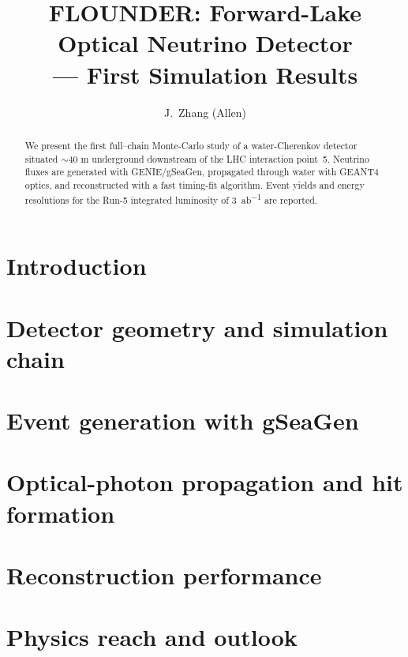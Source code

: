 \documentclass[11pt,aps,prd,nofootinbib,notitlepage]{revtex4-2}
\begin{document}
\title{FLOUNDER: Forward-Lake Optical Neutrino Detector\\
       --- First Simulation Results}

\author{J.~Zhang (Allen)}

\begin{abstract}
We present the first full–chain Monte-Carlo study of a
water-Cherenkov detector situated $\sim$40 m underground downstream
of the LHC interaction point~5.  Neutrino fluxes are generated with
GENIE/gSeaGen, propagated through water with GEANT4 optics, and
reconstructed with a fast timing-fit algorithm.  Event yields and
energy resolutions for the Run-5 integrated luminosity of
\SI{3}{\atto\barn^{-1}} are reported.
\end{abstract}

\maketitle

\section{Introduction}   %
\label{sec:intro}

\section{Detector geometry and simulation chain}
\label{sec:detector}

\section{Event generation with gSeaGen}
\label{sec:gseagen}

\section{Optical-photon propagation and hit formation}
\label{sec:geant4}

\section{Reconstruction performance}
\label{sec:reco}

\section{Physics reach and outlook}
\label{sec:physics}



\end{document}
